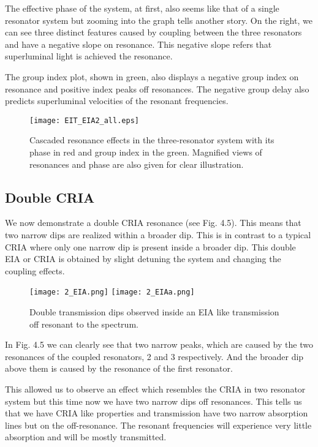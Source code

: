 The effective phase of the system, at first, also seems like that of a single resonator system but zooming into the graph tells another story. On the right, we can see three distinct features caused by coupling between the three resonators and have a negative slope on resonance. This negative slope refers that superluminal light is achieved the resonance.

The group index plot, shown in green, also displays a negative group index on resonance and positive index peaks off resonances. The negative group delay also predicts superluminal velocities of the resonant frequencies.
\newpage
\begin{figure}[h]
\centering
\texttt{[image: EIT\_EIA2\_all.eps]}
\caption{Cascaded resonance effects in the three-resonator system with its phase in red and group index in the green. Magnified views of resonances and phase are also given for clear illustration.}
\end{figure}

\subsection{Double CRIA}
We now demonstrate a double CRIA resonance (see Fig. 4.5). This means that two narrow dips are realized within a broader dip. This is in contrast to a typical CRIA where only one narrow dip is present inside a broader dip. This double EIA or CRIA is obtained by slight detuning the system and changing the coupling effects. 


\begin{figure}[t]
\centering
\texttt{[image: 2\_EIA.png]}
\texttt{[image: 2\_EIAa.png]}
\caption{Double transmission dips observed inside an EIA like transmission off resonant to the spectrum.}
\end{figure}

In Fig. 4.5 we can clearly see that two narrow peaks, which are caused by the two resonances of the coupled resonators, 2 and 3 respectively. And the broader dip above them is caused by the resonance of the first resonator. 


This allowed us to observe an effect which resembles the CRIA in two resonator system but this time now we have two narrow dips off resonances. This tells us that we have CRIA like properties and transmission have two narrow absorption lines but on the off-resonance. The resonant frequencies will experience very little absorption and will be mostly transmitted. 

